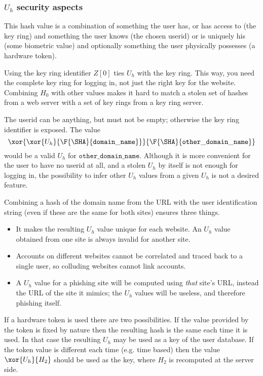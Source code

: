 \subsubsection{$U_h$ security aspects}
This hash value is a combination of something the user has,
or has access to
(the key ring)
and something the user knows
(the chosen userid)
or is uniquely his
(some biometric value)
and optionally something the user physically possesses
(a hardware token).
\par
Using the key ring identifier $Z[0]$ ties $U_h$ with the key ring.
This way, you need the complete key ring for logging in, not just the right key for the website.
Combining $H_0$ with other values makes it hard to match a stolen set of hashes from a web server
with a set of key rings from a key ring server.
\par
The userid can be anything, but must not be empty; otherwise the key ring identifier is exposed.
The value
\[\xor{\xor{U_h}{\F{\SHA}{\mathtt{domain\_name}}}}{\F{\SHA}{\mathtt{other\_domain\_name}}}\]
would be a valid $U_h$ for ${\mathtt{other\_domain\_name}}$.
Although it is more convenient for the user to have no userid at all,
and a stolen $U_h$ by itself is not enough for logging in,
the possibility to infer other $U_h$ values from a given $U_h$ is not a desired feature.
\par
Combining a hash of the domain name from the URL with the user identification string
(even if these are the same for both sites)
ensures three things.
\begin{itemize}
\item It makes the resulting $U_h$ value unique for each website.
An $U_h$ value obtained from one site is always invalid for another site.
\item Accounts on different websites cannot be correlated and traced back to a single user,
so colluding websites cannot link accounts.
\item A $U_h$ value for a phishing site will be computed using \emph{that} site's URL,
instead the URL of the site it mimics;
the $U_h$ values will be useless,
and therefore phishing itself.
\end{itemize}
\par
If a hardware token is used there are two possibilities.
If the value provided by the token is fixed by nature then the resulting hash is the same each time it is used.
In that case the resulting $U_h$ may be used as a key of the user database.
If the token value is different each time
(e.g. time based)
then the value $\xor{U_h}{H_2}$ should be used as the key,
where $H_2$ is recomputed at the server side.

